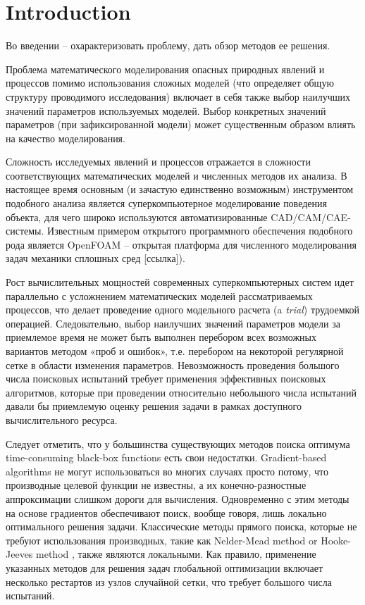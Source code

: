 \documentclass[sensors,article,submit,moreauthors,pdftex]{Definitions/mdpi}
\begin{document}
\section{Introduction}

Во введении -- охарактеризовать проблему, дать обзор методов ее решения.


Проблема математического моделирования опасных природных явлений и процессов помимо использования сложных моделей (что определяет общую структуру проводимого исследования) включает в себя также выбор наилучших значений параметров используемых моделей. Выбор конкретных значений параметров (при зафиксированной модели) может существенным образом влиять на качество моделирования. 

Сложность исследуемых явлений и процессов отражается в сложности соответствующих математических моделей и численных методов их анализа. В настоящее время основным (и зачастую единственно возможным) инструментом подобного анализа является суперкомпьютерное моделирование поведения объекта, для чего широко используются автоматизированные CAD/CAM/CAE-системы. Известным примером открытого программного обеспечения подобного рода является OpenFOAM -- открытая платформа для численного моделирования задач механики сплошных сред [ссылка]). 

Рост вычислительных мощностей современных суперкомпьютерных систем идет параллельно с усложнением математических моделей рассматриваемых процессов, что делает проведение одного модельного расчета (a \textit{trial}) трудоемкой операцией. Следовательно, выбор наилучших значений параметров модели за приемлемое время не может быть выполнен перебором всех возможных вариантов методом «проб и ошибок», т.е. перебором на некоторой регулярной сетке в области изменения параметров.
Невозможность проведения большого числа поисковых испытаний требует применения эффективных поисковых алгоритмов, которые при проведении относительно небольшого числа испытаний давали бы приемлемую оценку решения задачи в рамках доступного вычислительного ресурса.

Следует отметить, что у большинства существующих методов поиска оптимума time-consuming black-box functions есть свои недостатки. Gradient-based algorithms не могут использоваться во многих случаях просто потому, что производные целевой функции не известны, а их конечно-разностные аппроксимации слишком дороги для вычисления. Одновременно с этим методы на основе градиентов обеспечивают поиск, вообще говоря, лишь локально оптимального решения задачи.
Классические методы прямого поиска, которые не требуют использования производных, такие как Nelder-Mead method \cite{NelderMead} or Hooke-Jeeves method \cite{HookJeeves}, также являются локальными. Как правило, применение указанных методов для решения задач глобальной оптимизации включает несколько рестартов из узлов случайной сетки, что требует большого числа испытаний. 
\end{document}
